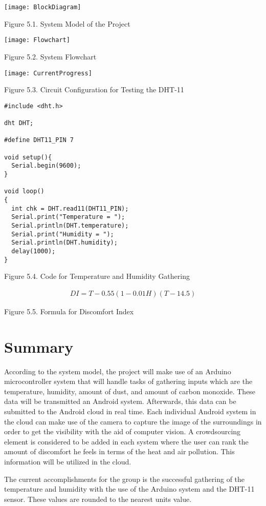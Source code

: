 \texttt{[image: BlockDiagram]}

\begin{center}
Figure 5.1. System Model of the Project
\end{center}

\begin{center}
\texttt{[image: Flowchart]}
\end{center}




\begin{center}
Figure 5.2. System Flowchart
\end{center}

\texttt{[image: CurrentProgress]}

\begin{center}
Figure 5.3. Circuit Configuration for Testing the DHT-11
\end{center}







\begin{lstlisting}
#include <dht.h>

dht DHT;

#define DHT11_PIN 7

void setup(){
  Serial.begin(9600);
}

void loop()
{
  int chk = DHT.read11(DHT11_PIN);
  Serial.print("Temperature = ");
  Serial.println(DHT.temperature);
  Serial.print("Humidity = ");
  Serial.println(DHT.humidity);
  delay(1000);
}
\end{lstlisting}

\begin{center}
Figure 5.4. Code for Temperature and Humidity Gathering
\end{center}
\begin{center}
\begin{eqnarray}
DI = T-0.55(1-0.01H)(T-14.5)
\label{Discomfort Index}
\end{eqnarray}
\end{center}
\begin{center}
Figure 5.5. Formula for Discomfort Index
\end{center}

\section{Summary}

According to the system model, the project will make use of an Arduino microcontroller system that will handle tasks of gathering inputs which are the temperature, humidity, amount of dust, and amount of carbon monoxide. These data will be transmitted an Android system. Afterwards, this data can be submitted  to the Android cloud in real time. Each individual Android system in the cloud can make use of the camera to capture the image of the surroundings in order to get the visibility with the aid of computer vision. A crowdsourcing element is considered to be added in each system where the user can rank the amount of discomfort he feels in terms of the heat and air pollution. This information will be utilized in the cloud.

The current accomplishments for the group is the successful gathering of the temperature and humidity with the use of the Arduino system and the DHT-11 sensor. These values are rounded to the nearest units value.